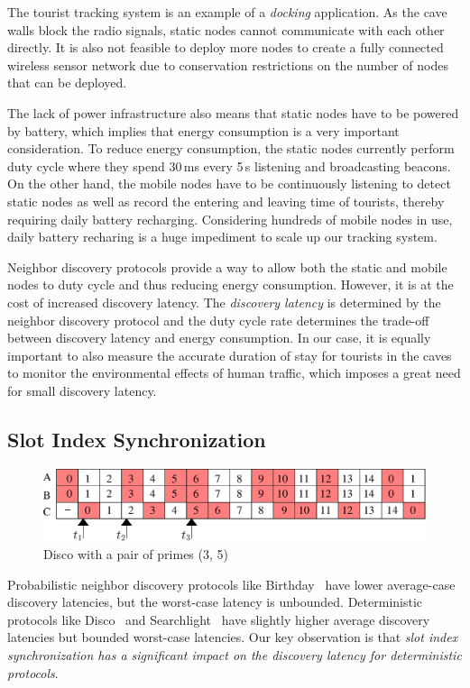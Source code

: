 \documentclass[twoside,twocolumn]{article}
\begin{document}
The tourist tracking system is an example of a {\em docking}
application. As the cave walls block the radio signals, static nodes
cannot communicate with each other directly. It is also not feasible
to deploy more nodes to create a fully connected wireless sensor
network due to conservation restrictions on the number of nodes that
can be deployed.

The lack of power infrastructure also means that static nodes have to
be powered by battery, which implies that energy consumption is a very
important consideration. To reduce energy consumption, the static
nodes currently perform duty cycle where they spend 30\,ms every 5\,s
listening and broadcasting beacons.  On the other hand, the mobile
nodes have to be continuously listening to detect static nodes as well
as record the entering and leaving time of tourists, thereby requiring
daily battery recharging. Considering hundreds of mobile nodes in use,
daily battery recharing is a huge impediment to scale up our tracking
system.

Neighbor discovery protocols provide a way to allow both the static and 
mobile nodes to duty cycle and thus reducing energy consumption. However, 
it is at the cost of increased discovery latency. The {\em discovery latency} 
is determined by the neighbor discovery protocol and the duty cycle rate 
determines the trade-off between discovery latency and energy consumption. 
In our case, it is equally important to also measure the accurate duration 
of stay for tourists in the caves to monitor the environmental effects of 
human traffic, which imposes a great need for small discovery latency.

\subsection{Slot Index Synchronization}

\begin{figure}[t]
   \centering
   \includegraphics[width=.9\columnwidth]{figs/disco_example}
   \caption{Disco with a pair of primes (3, 5)} 
   \label{fig:disco_example}
\end{figure}

Probabilistic neighbor discovery protocols like Birthday~\citep{mcglynn2001birthday} 
have lower average-case discovery latencies, but the worst-case latency 
is unbounded. Deterministic protocols like Disco~\citep{Dutta2008Practical} 
and Searchlight~\citep{bakht2012searchlight} have slightly higher average 
discovery latencies but bounded worst-case latencies. Our key observation 
is that {\em slot index synchronization has a significant impact on the 
discovery latency for deterministic protocols}.
\end{document}
